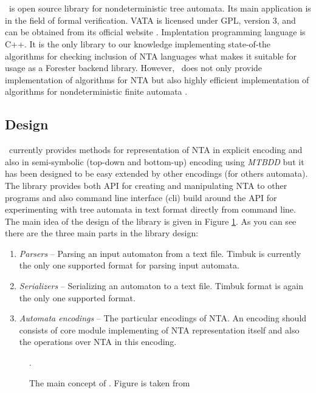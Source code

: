 \section{\vata}
\label{sec:VATA}

\vata\ is open source library for nondeterministic tree automata.
Its main application is in the field of formal verification.
VATA is licensed under GPL, version 3, and can be obtained from its official website \cite{www:vata}.
Implentation programming language is C++.
It is the only library to our knowledge implementing state-of-the algorithms for checking inclusion of NTA languages
what makes it suitable for usage as a Forester backend library.
However, \vata\ does not only provide implementation of algorithms for NTA but also highly efficient implementation of
algorithms for nondeterministic finite automata \cite{hruska13}.

\subsection{Design}
\vata\ currently provides methods for representation of NTA in explicit encoding and also in semi-symbolic (top-down and bottom-up)
encoding using \emph{MTBDD} but it has been designed to be easy extended by other encodings (for others automata).
The library provides both API for creating and manipulating NTA to other programs and also command line interface (cli) build around
the API for experimenting with tree automata in text format directly from command line.
The main idea of the design of the library is given in Figure \ref{fig:vata}.
As you can see there are the three main parts in the library design:
\begin{enumerate}
	\item \emph{Parsers} -- Parsing an input automaton from a text file.
		Timbuk \cite{timbuk} is currently the only one supported format for parsing input automata.
	\item \emph{Serializers} -- Serializing an automaton to a text file.
		Timbuk format is again the only one supported format.
	\item \emph{Automata encodings} -- The particular encodings of NTA.
		An encoding should consists of core module implementing of NTA representation itself
		and also the operations over NTA in this encoding.
\end{enumerate}

\begin{figure}[bt]
\begin{center}

		\caption{The main concept of \vata. Figure is taken from \cite{tacas12}}.
		\label{fig:vata}
\end{center}
\end{figure}

